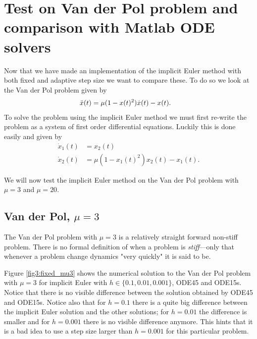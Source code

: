 \section{Test on Van der Pol problem and comparison with Matlab ODE solvers}
Now that we have made an implementation of the implicit Euler method with both fixed and adaptive step size we want to compare these. To do so we look at the Van der Pol problem given by
\begin{align}
    \Ddot{x}(t) &= \mu (1-x(t)^2) \dot{x}(t) - x(t).
\end{align}
To solve the problem using the implicit Euler method we must first re-write the problem as a system of first order differential equations. Luckily this is done easily and given by
\begin{align}
    \dot{x}_1(t) &= x_2(t) \\
    \dot{x}_2(t) &= \mu(1-x_1(t)^2) x_2(t) - x_1(t).
\end{align}

We will now test the implicit Euler method on the Van der Pol problem with $\mu = 3$ and $\mu = 20$. 

\subsection{Van der Pol, $\mu = 3$}
The Van der Pol problem with $\mu = 3$ is a relatively straight forward non-stiff problem. There is no formal definition of when a problem is \textit{stiff}---only that whenever a problem change dynamics "very quickly" it is said to be. 

Figure \ref{fig3:fixed_mu3} shows the numerical solution to the Van der Pol problem with $\mu = 3$ for implicit Euler with $h \in \{0.1, 0.01, 0.001\}$, ODE45 and ODE15s. Notice that there is no visible difference between the solution obtained by ODE45 and ODE15s. Notice also that for $h=0.1$ there is a quite big difference between the implicit Euler solution and the other solutions; for $h=0.01$ the difference is smaller and for $h=0.001$ there is no visible difference anymore. This hints that it is a bad idea to use a step size larger than $h=0.001$ for this particular problem.

